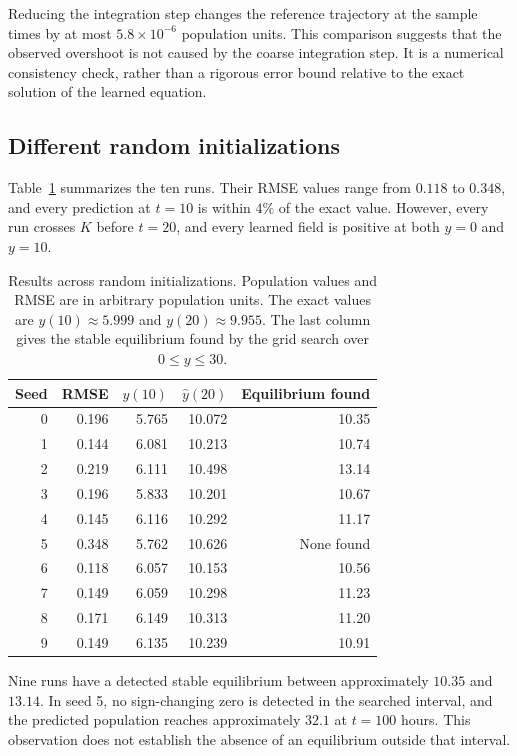 \documentclass[11pt]{article}
\begin{document}
Reducing the integration step changes the reference trajectory at the sample
times by at most $5.8\times10^{-6}$ population units. This comparison suggests
that the observed overshoot is not caused by the coarse integration step.
It is a numerical consistency check, rather than a rigorous error bound
relative to the exact solution of the learned equation.

\subsection{Different random initializations}

Table~\ref{tab:runs} summarizes the ten runs. Their RMSE values range from
$0.118$ to $0.348$, and every prediction at $t=10$ is within $4\%$ of the
exact value. However, every run crosses $K$ before $t=20$, and every learned
field is positive at both $y=0$ and $y=10$.

\begin{table}[tbp]
 \centering
 \caption{Results across random initializations. Population values and RMSE
 are in arbitrary population units. The exact values are $y(10)\approx5.999$
 and $y(20)\approx9.955$. The last column gives the stable equilibrium found
 by the grid search over $0\le y\le30$.}
 \label{tab:runs}
 \begin{tabular}{rrrrr}
 \toprule
 Seed & RMSE & $\hat y(10)$ & $\hat y(20)$ & Equilibrium found\\
 \midrule
 0 & 0.196 & 5.765 & 10.072 & 10.35\\
 1 & 0.144 & 6.081 & 10.213 & 10.74\\
 2 & 0.219 & 6.111 & 10.498 & 13.14\\
 3 & 0.196 & 5.833 & 10.201 & 10.67\\
 4 & 0.145 & 6.116 & 10.292 & 11.17\\
 5 & 0.348 & 5.762 & 10.626 & None found\\
 6 & 0.118 & 6.057 & 10.153 & 10.56\\
 7 & 0.149 & 6.059 & 10.298 & 11.23\\
 8 & 0.171 & 6.149 & 10.313 & 11.20\\
 9 & 0.149 & 6.135 & 10.239 & 10.91\\
 \bottomrule
 \end{tabular}
\end{table}

Nine runs have a detected stable equilibrium between approximately $10.35$
and $13.14$. In seed 5, no sign-changing zero is detected in the searched
interval, and the predicted population reaches approximately $32.1$ at
$t=100$ hours. This observation does not establish the absence of an
equilibrium outside that interval.
\end{document}
